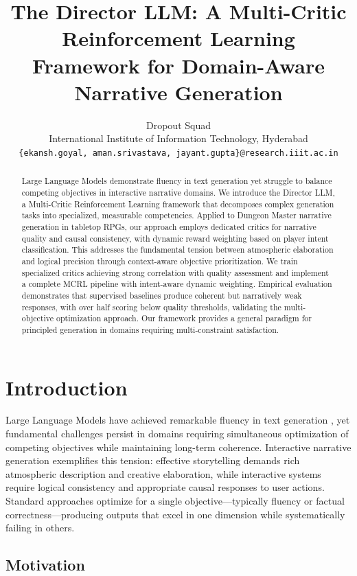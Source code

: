 \documentclass[11pt]{article}
\title{The Director LLM: A Multi-Critic Reinforcement Learning Framework for Domain-Aware Narrative Generation}
\author{Dropout Squad \\
International Institute of Information Technology, Hyderabad \\
\texttt{\{ekansh.goyal, aman.srivastava, jayant.gupta\}@research.iiit.ac.in}}
\date{}
\begin{document}
\maketitle

\begin{abstract}
Large Language Models demonstrate fluency in text generation yet struggle to balance competing objectives in interactive narrative domains. We introduce the Director LLM, a Multi-Critic Reinforcement Learning framework that decomposes complex generation tasks into specialized, measurable competencies. Applied to Dungeon Master narrative generation in tabletop RPGs, our approach employs dedicated critics for narrative quality and causal consistency, with dynamic reward weighting based on player intent classification. This addresses the fundamental tension between atmospheric elaboration and logical precision through context-aware objective prioritization. We train specialized critics achieving strong correlation with quality assessment and implement a complete MCRL pipeline with intent-aware dynamic weighting. Empirical evaluation demonstrates that supervised baselines produce coherent but narratively weak responses, with over half scoring below quality thresholds, validating the multi-objective optimization approach. Our framework provides a general paradigm for principled generation in domains requiring multi-constraint satisfaction.
\end{abstract}

\section{Introduction}

Large Language Models have achieved remarkable fluency in text generation \cite{ouyang2022training}, yet fundamental challenges persist in domains requiring simultaneous optimization of competing objectives while maintaining long-term coherence. Interactive narrative generation exemplifies this tension: effective storytelling demands rich atmospheric description and creative elaboration, while interactive systems require logical consistency and appropriate causal responses to user actions. Standard approaches optimize for a single objective—typically fluency or factual correctness—producing outputs that excel in one dimension while systematically failing in others.

\subsection{Motivation}
\end{document}
